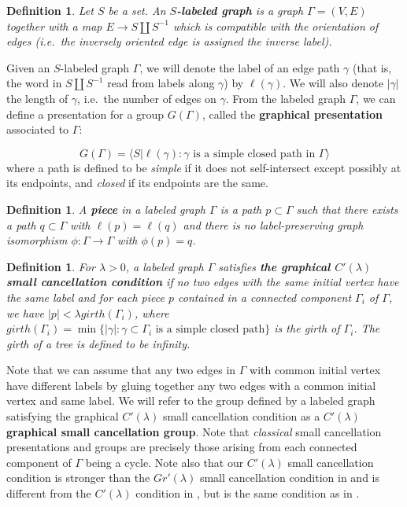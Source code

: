 \documentclass{article}[11pt]
\newtheorem{defn}[thm]{Definition}
\newcommand{\DO}[1]{{\textcolor{green}{{\bf Damian:}{\small {~#1~}}}}}
\begin{document}
{\begin{defn}
    Let $S$ be a set. An \textbf{$S$-labeled graph} is a graph $\Gamma = (V,E)$ together with a map $E \to S \coprod S^{-1}$ which is compatible with the orientation of edges (i.e.\ the inversely oriented edge is assigned the inverse label). 
\end{defn}

Given an $S$-labeled graph $\Gamma$, we will denote the label of an edge path $\gamma$ (that is, the word in $S \coprod S^{-1}$ read from labels along $\gamma$) by $\ell(\gamma)$. 
We will also denote $\vert \gamma \vert$ the length of $\gamma$, i.e.\ the number of edges on $\gamma$. From the labeled graph $\Gamma$, we can define a presentation for a group $G(\Gamma)$, called the \textbf{graphical presentation} associated to $\Gamma$: 

$$G(\Gamma) = \langle S \vert \ell(\gamma) : \text{$\gamma$ is a simple closed path in $\Gamma$} \rangle$$
where a path is defined to be \emph{simple} if it does not self-intersect except possibly at its endpoints, and \emph{closed} if its endpoints are the same. 

\begin{defn}
    A \textbf{piece} in a labeled graph $\Gamma$ is a path $p \subset \Gamma$ such that there exists a path $q \subset \Gamma$ with $\ell(p) = \ell(q)$ and there is no label-preserving graph isomorphism $\phi : \Gamma \to \Gamma$ with $\phi(p) = q$. 
\end{defn}

\begin{defn}
    For $\lambda > 0$, a labeled graph $\Gamma$ satisfies \textbf{the graphical $C'(\lambda)$ small cancellation condition} if no two edges with the same initial vertex have the same label and for each piece $p$ contained in a connected component $\Gamma_i$ of $\Gamma$, we have $\vert p \vert < \lambda girth(\Gamma_i)$, where $girth(\Gamma_i) = \min \{\vert \gamma \vert: \gamma \subset \Gamma_i \text{ is a simple closed path}\}$ is the \emph{girth} of $\Gamma_i$. The girth of a tree is defined to be infinity. 
\end{defn}

Note that we can assume that any two edges in $\Gamma$ with common initial vertex have different labels by gluing together any two edges with a common initial vertex and same label. We will refer to the group defined by a labeled graph satisfying the graphical $C'(\lambda)$ small cancellation condition as a $C'(\lambda)$ \textbf{graphical small cancellation group}. Note that \emph{classical} small cancellation presentations and groups are precisely those arising from each connected component of $\Gamma$ being a cycle. Note also that our $C'(\lambda)$ small cancellation condition is stronger than the $Gr'(\lambda)$ small cancellation condition in \cite[Definition 2.3]{Gruber_Sisto} and is different from the $C'(\lambda)$ condition in \cite[Page 5]{Gruber_Sisto}, but is the same condition as in \cite{OsajdaMonsters}.

}
\end{document}
